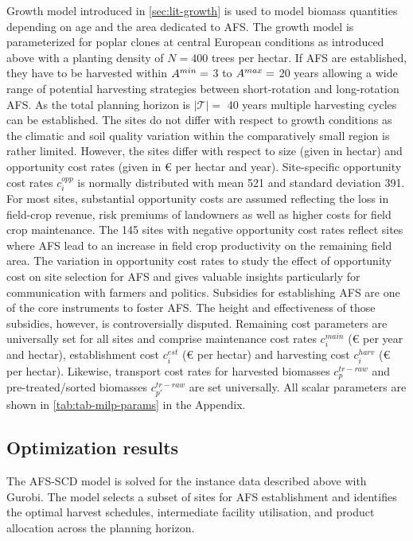 \documentclass[APA,TimesLARGE]{WileyNJDv5} %
\begin{document}
Growth model introduced in \autoref{sec:lit-growth} is used to model biomass quantities depending on age and the area dedicated to AFS. The growth model is parameterized for poplar clones at central European conditions as introduced above with a planting density of \(N=400\) trees per hectar. If AFS are established, they have to be harvested within \(A^{\\min}=\) 3 to \(A^{\\max}=\) 20 years allowing a wide range of potential harvesting strategies between short-rotation and long-rotation AFS. As the total planning horizon is \(|\mathcal{T}|=\) 40 years multiple harvesting cycles can be established. The sites do not differ with respect to growth conditions as the climatic and soil quality variation within the comparatively small region is rather limited. However, the sites differ with respect to size (given in hectar) and opportunity cost rates (given in \euro{} per hectar and year). Site-specific opportunity cost rates \(c^{opp}_i\) is normally distributed with mean 521 and standard deviation 391. For most sites, substantial opportunity costs are assumed reflecting the loss in field-crop revenue, risk premiums of landowners as well as higher costs for field crop maintenance. The 145 sites with negative opportunity cost rates reflect sites where AFS lead to an increase in field crop productivity on the remaining field area. The variation in opportunity cost rates to study the effect of opportunity cost on site selection for AFS and gives valuable insights particularly for communication with farmers and politics. Subsidies for establishing AFS are one of the core instruments to foster AFS. The height and effectiveness of those subsidies, however, is controversially disputed. Remaining cost parameters are universally set for all sites and comprise maintenance cost rates \(c^{main}_i\) (\euro{} per year and hectar), establishment cost \(c^{est}_i\) (\euro{} per hectar) and harvesting cost \(c^{harv}_i\) (\euro{} per hectar). Likewise, transport cost rates for harvested biomasses \(c^{tr-raw}_p\) and pre-treated/sorted biomasses \(c^{tr-raw}_{p'}\) are set universally. All scalar parameters are shown in \autoref{tab:tab-milp-params} in the Appendix.

\subsection{Optimization results}\label{optimization-results}

The AFS-SCD model is solved for the instance data described above with Gurobi. The model selects a subset of sites for AFS establishment and identifies the optimal harvest schedules, intermediate facility utilisation, and product allocation across the planning horizon.
\end{document}
